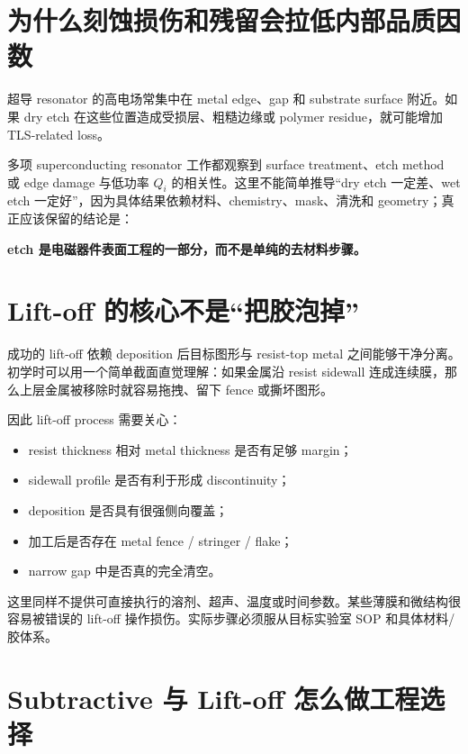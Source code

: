 \section{为什么刻蚀损伤和残留会拉低内部品质因数}

超导 resonator 的高电场常集中在 metal edge、gap 和 substrate surface 附近。如果 dry etch 在这些位置造成受损层、粗糙边缘或 polymer residue，就可能增加 TLS-related loss。

多项 superconducting resonator 工作都观察到 surface treatment、etch method 或 edge damage 与低功率 $Q_i$ 的相关性。这里不能简单推导“dry etch 一定差、wet etch 一定好”，因为具体结果依赖材料、chemistry、mask、清洗和 geometry；真正应该保留的结论是：

\begin{center}
\textbf{etch 是电磁器件表面工程的一部分，而不是单纯的去材料步骤。}
\end{center}

\section{Lift-off 的核心不是“把胶泡掉”}

成功的 lift-off 依赖 deposition 后目标图形与 resist-top metal 之间能够干净分离。初学时可以用一个简单截面直觉理解：如果金属沿 resist sidewall 连成连续膜，那么上层金属被移除时就容易拖拽、留下 fence 或撕坏图形。

因此 lift-off process 需要关心：

\begin{itemize}
  \item resist thickness 相对 metal thickness 是否有足够 margin；
  \item sidewall profile 是否有利于形成 discontinuity；
  \item deposition 是否具有很强侧向覆盖；
  \item 加工后是否存在 metal fence / stringer / flake；
  \item narrow gap 中是否真的完全清空。
\end{itemize}

\begin{warningbox}
这里同样不提供可直接执行的溶剂、超声、温度或时间参数。某些薄膜和微结构很容易被错误的 lift-off 操作损伤。实际步骤必须服从目标实验室 SOP 和具体材料/胶体系。
\end{warningbox}

\section{Subtractive 与 Lift-off 怎么做工程选择}

